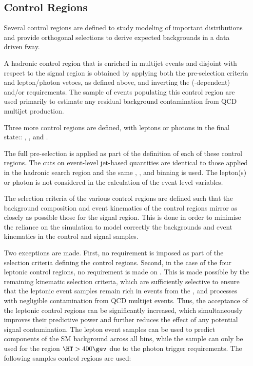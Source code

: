 \subsection{Control Regions}

Several control regions are defined to study modeling of important distributions and provide
orthogonal selections to derive expected backgrounds in a data driven fway.


A hadronic control region that is enriched in multijet events and
disjoint with respect to the signal region is obtained by applying both the pre-selection criteria and lepton/photon vetoes, as defined
above, and inverting the (\HT-dependent) \alphat and/or \mhtmet requirements. 
The sample of events populating this control region are used primarily to estimate any residual background contamination from QCD multijet production.

Three more control regions are defined, with leptons or photons in the final state:: \mj, \mmj, and \gj. 

The full pre-selection is applied as part of the definition of each of these control regions. The cuts on event-level jet-based quantities are identical to
those applied in the hadronic search region and the same \njet, \nb, and \scalht binning is used. The lepton(s) or photon is not considered
in the calculation of the event-level variables.

The selection criteria of the various control regions are defined such that the background composition and event kinematics of the control
regions mirror as closely as possible those for the signal region. This is done in order to minimise the reliance on the simulation to model correctly the backgrounds and event kinematics in
the control and signal samples.

Two exceptions are made. First, no \bdphi requirement is imposed as part of the selection criteria defining the control regions. Second,
in the case of the four leptonic control regions, no requirement is made on \alphat. This is made possible by the remaining kinematic
selection criteria, which are sufficiently selective to ensure that the leptonic event samples remain rich in events from the \wj, \ttbar
and \zll processes with negligible contamination from QCD multijet events. Thus, the acceptance of the leptonic control regions can be
significantly increased, which simultaneously improves their predictive power and further reduces the effect of any potential
signal contamination.
The lepton event samples can be used to predict components of the SM background across all \scalht bins, while the \gj sample can only be
used for the region $\HT > 400\gev$ due to the photon trigger requirements. The following samples control regions are used:

